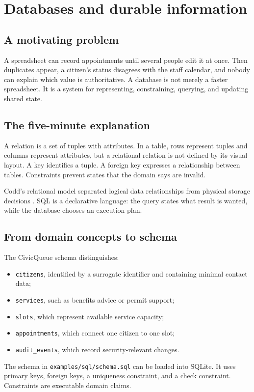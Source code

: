\chapter{Databases and durable information}
\label{ch:databases}

\section{A motivating problem}
A spreadsheet can record appointments until several people edit it at once. Then duplicates appear, a citizen's status disagrees with the staff calendar, and nobody can explain which value is authoritative. A database is not merely a faster spreadsheet. It is a system for representing, constraining, querying, and updating shared state.


\section{The five-minute explanation}
A relation is a set of tuples with attributes. In a table, rows represent tuples and columns represent attributes, but a relational relation is not defined by its visual layout. A key identifies a tuple. A foreign key expresses a relationship between tables. Constraints prevent states that the domain says are invalid.

Codd's relational model separated logical data relationships from physical storage decisions \citep{codd1970relational}. SQL is a declarative language: the query states what result is wanted, while the database chooses an execution plan.

\section{From domain concepts to schema}
The CivicQueue schema distinguishes:
\begin{itemize}
\item \texttt{citizens}, identified by a surrogate identifier and containing minimal contact data;
\item \texttt{services}, such as benefits advice or permit support;
\item \texttt{slots}, which represent available service capacity;
\item \texttt{appointments}, which connect one citizen to one slot;
\item \texttt{audit\_events}, which record security-relevant changes.
\end{itemize}
The schema in \texttt{examples/sql/schema.sql} can be loaded into SQLite. It uses primary keys, foreign keys, a uniqueness constraint, and a check constraint. Constraints are executable domain claims.

